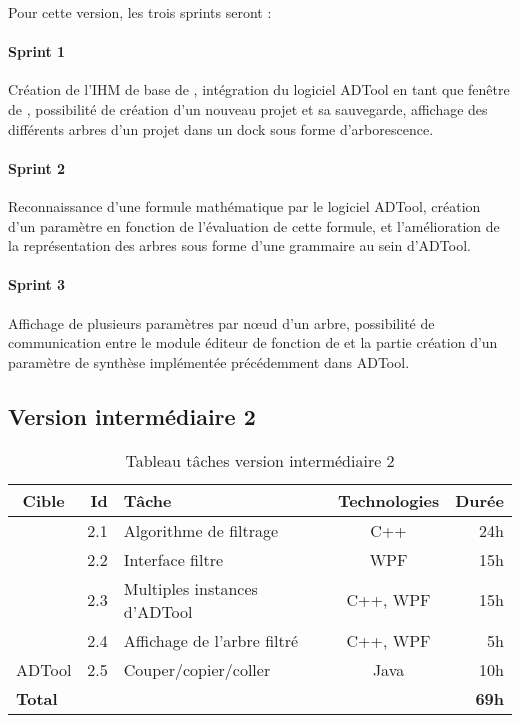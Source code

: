 		Pour cette version, les trois sprints seront :
		\paragraph{Sprint 1} Création de l'IHM de base de \glasir{}, intégration du logiciel ADTool en tant que fenêtre de \glasir{}, possibilité de création d'un nouveau projet et sa sauvegarde, affichage des différents arbres d'un projet dans un dock sous forme d'arborescence.
		\paragraph{Sprint 2} Reconnaissance d'une formule mathématique par le logiciel ADTool, création d'un paramètre en fonction de l'évaluation de cette formule, et l'amélioration de la représentation des arbres sous forme d'une grammaire au sein d'ADTool.
		\paragraph{Sprint 3} Affichage de plusieurs paramètres par nœud d'un arbre, possibilité de communication entre le module éditeur de fonction de \glasir{} et la partie création d'un paramètre de synthèse implémentée précédemment dans ADTool. 

	\subsection{Version intermédiaire 2}

		\begin{table}[h]
			\centering
			\begin{tabular}{|c|r|l|c|r|}
				\hline
				\textbf{Cible} & \textbf{Id} & \textbf{Tâche} & \textbf{Technologies} & \textbf{Durée}\\
				\hline

				\multirow{4}{*}{\glasir{}} & 2.1 & Algorithme de filtrage & C++ & 24h\\
				\cline{2-5}
				 & 2.2 & Interface filtre & WPF & 15h\\
				\cline{2-5}
				 & 2.3 & Multiples instances d'ADTool & C++, WPF & 15h\\
				\cline{2-5}
				 & 2.4 & Affichage de l'arbre filtré & C++, WPF & 5h\\
				\hline

				\multirow{1}{*}{ADTool} & 2.5 & Couper/copier/coller & \multirow{1}{*}{Java} & 10h\\
				\hline

				\multicolumn{4}{|l|}{\bf Total} & {\bf 69h}\\
				\hline
			\end{tabular}
			\caption{Tableau tâches version intermédiaire 2}
			\label{fig:taches_units_2}
		\end{table}

